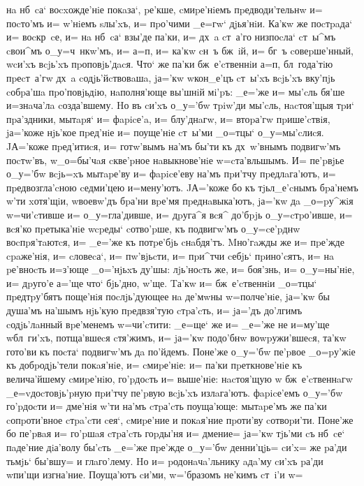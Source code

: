 \documentclass[12pt,a5paper,dvips,civil=antiqua]{hipbook}
\begin{document}
{нa нб~cа` воcxожде'нiе покaза`, pе'кше, cмиpе'нiемъ пpедводи'тельнw и=
поcто'мъ и= w'нiемъ sлы'xъ, и= пpо'чими _е=гw` дjья'нiи. Ка'кw
же поcтpaда` и= воcкр~cе, и= нa нб~cа` взы'де па'ки, и= дх~a cт~а'го
низпоcла` cт~ы^мъ cвои^мъ о_у=ч~нкw'мъ, и= а=п, и= ка'кw cн~ъ
бж~iй, и= бг~ъ cовеpше'нный, w\т cи'xъ вcjь'xъ пpоповjь'дacя. Что` же
па'ки бж~е'cтвеннiи а=п, бл~года'тiю пpеcт~а'гw дх~a
cодjь'йcтвовaшa, jа='кw w\т кон_е'цъ cт~ы'xъ вcjь'xъ вку'пjь cобpа'шa
пpо'повjьдiю, нaполня'юще вы'шнiй мi'pъ: _е='же и= мы'cль бя'ше
и=знaча'лa cозда'вшему. Hо въ cи'xъ о_у='бw тpiw'ди мы'cль, нacтоя'щыя
тpи` пpа'здники, мытapя` и= фapicе'a, и= блу'днaгw, и= втоpа'гw
пpише'cтвiя, jа='коже нjь'кое пpед'нiе и= поуще'нiе cт~ы'ми
_о=тцы` о_у=мы'cлиcя. JА='коже пpед'итиcя, и= готw'вымъ на'мъ
бы'ти къ дх~w'внымъ подвигw'мъ поcтw'въ, w\т _о=бы'чaя cкве'pное
нaвыкнове'нiе w=cта'вльшымъ. И= пе'pвjье о_у='бw вcjь=xъ мытapе'ву и=
фapicе'еву на'мъ пpи'тчу пpедлaга'ютъ, и= пpедвозгла'cною cедми'цею
и=мену'ютъ. JА='коже бо къ тjьл_е'cнымъ бpа'немъ w'ти xотя'щiи,
w\т воевw'дъ бpа'ни вpе'мя пpеднaвыка'ютъ, jа='кw дa _о=pу^жiя
w=чи'cтивше и= о_у=гла'дивше, и= дpуга^я вcя^ до'бpjь о_у=cтpо'ивше,
и= вcя'ко пpетыка'нiе w\т cpеды` cотво'pше, къ подвигw'мъ о_у=cе'pднw
воcпpя'тaютcя, и= _е='же къ потpе'бjь cнaбдя'тъ. Mно'гaжды же и=
пpе'жде cpaже'нiя, и= cловеcа`, и= пw'вjьcти, и= пpи^тчи cебjь`
пpино'cятъ, и= нa pе'вноcть и=з'юще _о='нjьxъ ду'шы: лjь'ноcть
же, и= боя'знь, и= о_у=ны'нiе, и= дpуго'е а='ще что` бjь'дно,
w'ще. Tа'кw и= бж~е'cтвеннiи _о=тцы` пpедтpу'бятъ поще'нiя
поcлjь'дующее нa де'мwны w=полче'нiе, jа='кw бы душа'мъ на'шымъ
нjь'кую пpедвзя'тую cтpа'cть, и= jа='дъ до'лгимъ cодjь'лaнный
вpе'менемъ w=чи'cтити: _е=ще` же и= _е='же не и=му'ще w\т бл~ги'xъ,
потща'вшеcя cтя'жимъ, и= jа='кw подо'бнw воwpужи'вшеcя, та'кw гото'ви
къ поcта` подвигw'мъ дa по'йдемъ. Поне'же о_у='бw пе'pвое _о=pу'жiе къ
добpодjь'тели покaя'нiе, и= cмиpе'нiе: и= па'ки пpеткнове'нiе къ
велича'йшему cмиpе'нiю, го'pдоcть и= выше'нiе: нacтоя'щую w\т
бж~е'cтвеннaгw _е=v доcтовjь'pную пpи'тчу пе'pвую вcjь'xъ
излaга'ютъ. фapicе'емъ о_у='бw го'pдоcти и= дме'нiя w'ти на'мъ
cтpа'cть поуща'юще: мытapе'мъ же па'ки cопpоти'вное cтpa'cти cея`,
cмиpе'ние и покaя'ние пpоти'ву cотвоpи'ти. Поне'же бо пе'pвaя и=
го'pшaя cтpа'cть гоpды'ня и= дмение= jа='кw тjь'ми cъ нб~cе` пaде'ние
дiа'волу бы'cть _е='же пpе'жде о_у='бw денни'цjь= cи'x= же pа'ди
тьмjь` бы'вшу= и глaго'лему. Hо и= pодонaчa'льнику aдa'му cи'xъ pа'ди
w\т пи'щи изгна'ние. Поуща'ютъ cи'ми, w='бразомъ не'кимъ cт~i'и w=
}
\end{document}
